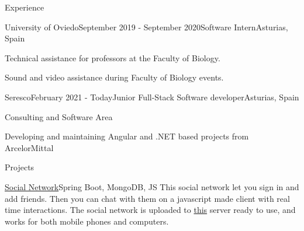 \documentclass{resume} %
\begin{document}
\begin{rSection}{Experience}


\begin{rSubsection}{University of Oviedo}{September 2019 - September 2020}{Software Intern}{Asturias, Spain}
\item Technical assistance for professors at the Faculty of Biology.
\item Sound and video assistance during Faculty of Biology events.
\end{rSubsection}

\begin{rSubsection}{Seresco}{February 2021 - Today}{Junior Full-Stack Software developer}{Asturias, Spain}
\item Consulting and Software Area
\item Developing and maintaining Angular and .NET based projects from ArcelorMittal
\end{rSubsection}

\end{rSection}


\begin{rSection}{Projects}


\begin{rSubsection}{\href{https://chatwithyouwant.herokuapp.com}{Social Network}}{Spring Boot, MongoDB, JS}{}{}
This social network let you sign in and add friends. Then you can chat with them on a javascript made client with real time interactions.
The social network is uploaded to \href{https://chatwithyouwant.herokuapp.com}{this} server ready to use, and works for both mobile phones and computers.
\end{rSubsection}


\end{rSection}

\end{document}
